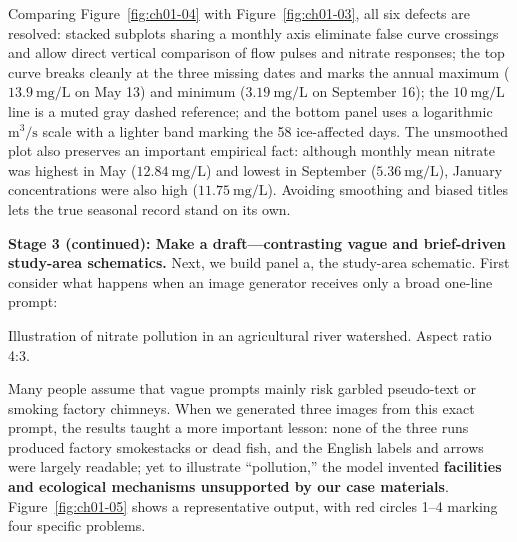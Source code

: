 Comparing Figure~\ref{fig:ch01-04} with Figure~\ref{fig:ch01-03}, all six defects are resolved: stacked subplots sharing a monthly axis eliminate false curve crossings and allow direct vertical comparison of flow pulses and nitrate responses; the top curve breaks cleanly at the three missing dates and marks the annual maximum ($13.9\ \text{mg/L}$ on May 13) and minimum ($3.19\ \text{mg/L}$ on September 16); the $10\ \text{mg/L}$ line is a muted gray dashed reference; and the bottom panel uses a logarithmic $\text{m}^3/\text{s}$ scale with a lighter band marking the 58 ice-affected days. The unsmoothed plot also preserves an important empirical fact: although monthly mean nitrate was highest in May ($12.84\ \text{mg/L}$) and lowest in September ($5.36\ \text{mg/L}$), January concentrations were also high ($11.75\ \text{mg/L}$). Avoiding smoothing and biased titles lets the true seasonal record stand on its own.

\textbf{Stage 3 (continued): Make a draft---contrasting vague and brief-driven study-area schematics.} Next, we build panel a, the study-area schematic. First consider what happens when an image generator receives only a broad one-line prompt:

\begin{Prompt}
Illustration of nitrate pollution in an agricultural river watershed. Aspect ratio 4:3.
\end{Prompt}

Many people assume that vague prompts mainly risk garbled pseudo-text or smoking factory chimneys. When we generated three images from this exact prompt, the results taught a more important lesson: none of the three runs produced factory smokestacks or dead fish, and the English labels and arrows were largely readable; yet to illustrate ``pollution,'' the model invented \textbf{facilities and ecological mechanisms unsupported by our case materials}. Figure~\ref{fig:ch01-05} shows a representative output, with red circles 1--4 marking four specific problems.

